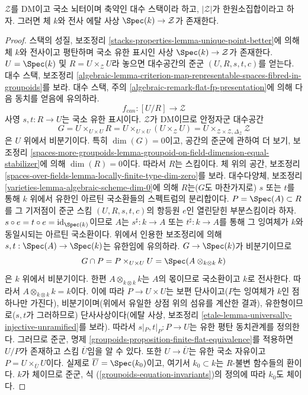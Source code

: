 \begin{lemma}
\label{lemma-DM-residual-gerbe}
$\mathcal{Z}$를 DM이고 국소 뇌터이며 축약인 대수 스택이라 하고,
$|\mathcal{Z}|$가 한원소집합이라고 하자. 그러면 체 $k$와 전사 에탈
사상 $\Spec(k) \to \mathcal{Z}$가 존재한다.
\end{lemma}

\begin{proof}
스택의 성질, 보조정리
\ref{stacks-properties-lemma-unique-point-better}에 의해 체 $k$와
전사이고 평탄하며 국소 유한 표시인 사상
$\Spec(k) \to \mathcal{Z}$가 존재한다. $U = \Spec(k)$ 및
$R = U \times_\mathcal{Z} U$라 놓으면 대수공간의 준군
$(U, R, s, t, c)$를 얻는다. 대수 스택, 보조정리
\ref{algebraic-lemma-criterion-map-representable-spaces-fibred-in-groupoids}를
보라. 대수 스택, 주의 \ref{algebraic-remark-flat-fp-presentation}에 의해
다음 동치를 얻음에 유의하라.
$$
f_{can} : [U/R] \longrightarrow \mathcal{Z}
$$
사영 $s, t : R \to U$는 국소 유한 표시이다.
$\mathcal{Z}$가 DM이므로 안정자군 대수공간
$$
G = U \times_{U \times U} R = U \times_{U \times U} (U \times_\mathcal{Z} U) =
U \times_{\mathcal{Z} \times \mathcal{Z}, \Delta_\mathcal{Z}} \mathcal{Z}
$$
은 $U$ 위에서 비분기이다. 특히 $\dim(G) = 0$이고, 공간의 준군에
관하여 더 보기, 보조정리
\ref{spaces-more-groupoids-lemma-groupoid-on-field-dimension-equal-stabilizer}에
의해 $\dim(R) = 0$이다. 따라서 $R$는 스킴이다. 체 위의 공간,
보조정리 \ref{spaces-over-fields-lemma-locally-finite-type-dim-zero}를 보라.
대수다양체, 보조정리 \ref{varieties-lemma-algebraic-scheme-dim-0}에 의해
$R$는($G$도 마찬가지로) $s$ 또는 $t$를 통해 $k$ 위에서 유한인 아르틴
국소환들의 스펙트럼의 분리합이다. $P = \Spec(A) \subset R$를 그
기저점이 준군 스킴 $(U, R, s, t, c)$의 항등원 $e$인 열린닫힌
부분스킴이라 하자. $s \circ e = t \circ e = \text{id}_{\Spec(k)}$이므로
$A$는 $s^\sharp : k \to A$ 또는 $t^\sharp : k \to A$를 통해 그 잉여체가
$k$와 동일시되는 아르틴 국소환이다. 위에서 인용한 보조정리에 의해
$s, t : \Spec(A) \to \Spec(k)$는 유한임에 유의하라.
$G \to \Spec(k)$가 비분기이므로
$$
G \cap P = P \times_{U \times U} U = \Spec(A \otimes_{k \otimes k} k)
$$
은 $k$ 위에서 비분기이다. 한편 $A \otimes_{k \otimes k} k$는 $A$의
몫이므로 국소환이고 $k$로 전사한다. 따라서
$A \otimes_{k \otimes k} k = k$이다. 이에 따라
$P \to U \times U$는 보편 단사이고($P$는 잉여체가 $k$인 점 하나만
가진다), 비분기이며(위에서 유일한 상점 위의 섬유를 계산한 결과),
유한형이므로($s, t$가 그러하므로) 단사사상이다(에탈 사상, 보조정리
\ref{etale-lemma-universally-injective-unramified}를 보라).
따라서 $s|_P, t|_P : P \to U$는 유한 평탄 동치관계를 정의한다.
그러므로 준군, 명제
\ref{groupoids-proposition-finite-flat-equivalence}를 적용하면 $U/P$가
존재하고 스킴 $\overline{U}$임을 알 수 있다. 또한
$U \to \overline{U}$는 유한 국소 자유이고
$P = U \times_{\overline{U}} U$이다.
실제로 $\overline{U} = \Spec(k_0)$이고, 여기서 $k_0 \subset k$는
$R$-불변 함수들의 환이다. $k$가 체이므로 준군, 식
(\ref{groupoids-equation-invariants})의 정의에 따라 $k_0$도 체이다.


\end{proof}
